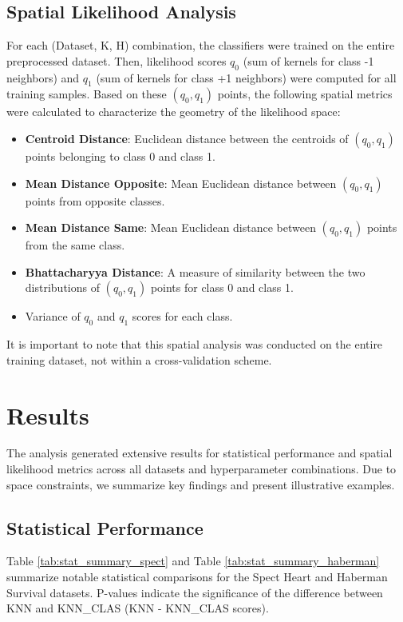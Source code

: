 \documentclass[conference]{IEEEtran}
\begin{document}
\subsection{Spatial Likelihood Analysis}
For each (Dataset, K, H) combination, the classifiers were trained on the entire preprocessed dataset. Then, likelihood scores $q_0$ (sum of kernels for class -1 neighbors) and $q_1$ (sum of kernels for class +1 neighbors) were computed for all training samples. Based on these $(q_0, q_1)$ points, the following spatial metrics were calculated to characterize the geometry of the likelihood space:
\begin{itemize}
    \item \textbf{Centroid Distance}: Euclidean distance between the centroids of $(q_0, q_1)$ points belonging to class 0 and class 1.
    \item \textbf{Mean Distance Opposite}: Mean Euclidean distance between $(q_0, q_1)$ points from opposite classes.
    \item \textbf{Mean Distance Same}: Mean Euclidean distance between $(q_0, q_1)$ points from the same class.
    \item \textbf{Bhattacharyya Distance}: A measure of similarity between the two distributions of $(q_0, q_1)$ points for class 0 and class 1.
    \item Variance of $q_0$ and $q_1$ scores for each class.
\end{itemize}
It is important to note that this spatial analysis was conducted on the entire training dataset, not within a cross-validation scheme.

\section{Results}
The analysis generated extensive results for statistical performance and spatial likelihood metrics across all datasets and hyperparameter combinations. Due to space constraints, we summarize key findings and present illustrative examples.

\subsection{Statistical Performance}
Table \ref{tab:stat_summary_spect} and Table \ref{tab:stat_summary_haberman} summarize notable statistical comparisons for the Spect Heart and Haberman Survival datasets. P-values indicate the significance of the difference between KNN and KNN\_CLAS (KNN - KNN\_CLAS scores).
\end{document}
